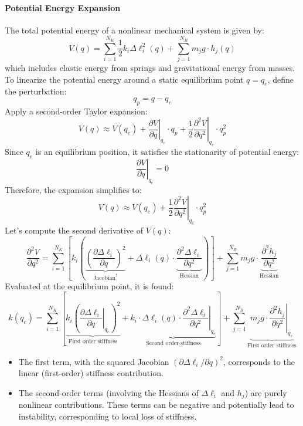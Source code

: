 \paragraph{Potential Energy Expansion}

The total potential energy of a nonlinear mechanical system is given by:
\[
V(q) = \sum_{i=1}^{N_K} \frac{1}{2} k_i \Delta \ell_i^2(q) + \sum_{j=1}^{N_B} m_j g \cdot h_j(q)
\]
which includes elastic energy from springs and gravitational energy from masses. To linearize the potential energy around a static equilibrium point \( q = q_e \), define the perturbation:
\[
q_p = q - q_e
\]
Apply a second-order Taylor expansion:
\[
V(q) \approx V(q_e) + \left. \frac{\partial V}{\partial q} \right|_{q_e} \cdot q_p
+ \frac{1}{2} \left. \frac{\partial^2 V}{\partial q^2} \right|_{q_e} \cdot q_p^2
\]
Since \( q_e \) is an equilibrium position, it satisfies the stationarity of potential energy:
\[
\left. \frac{\partial V}{\partial q} \right|_{q_e} = 0
\]
Therefore, the expansion simplifies to:
\[
V(q) \approx V(q_e) + \frac{1}{2} \left. \frac{\partial^2 V}{\partial q^2} \right|_{q_e} \cdot q_p^2
\]
Let's compute the second derivative of \( V(q) \):
\[
\frac{\partial^2 V}{\partial q^2} =
\sum_{i=1}^{N_K} \left[
k_i \left( \underbrace{\left( \frac{\partial \Delta \ell_i}{\partial q} \right)^2}_{\text{Jacobian}^2}
+ \Delta \ell_i(q) \cdot \underbrace{\frac{\partial^2 \Delta \ell_i}{\partial q^2}}_{\text{Hessian}} \right)
\right]
+ \sum_{j=1}^{N_B} m_j g \cdot \underbrace{\frac{\partial^2 h_j}{\partial q^2}}_{\text{Hessian}}
\]
Evaluated at the equilibrium point, it is found:
\[
k(q_e) =
\sum_{i=1}^{N_K} \left[ \underbrace{k_i
\left( \left. \frac{\partial \Delta \ell_i}{\partial q} \right|_{q_e} \right)^2}_{\text{First order stiffness}}
+ \underbrace{\left. k_i \cdot \Delta \ell_i(q) \cdot \frac{\partial^2 \Delta \ell_i}{\partial q^2} \right|_{q_e}}_{\text{Second order stiffness}}
\right]
+ \sum_{j=1}^{N_B} \underbrace{m_j g \cdot \left. \frac{\partial^2 h_j}{\partial q^2} \right|_{q_e}}_{\text{First order stiffness}}
\]
\begin{itemize}
    \item The first term, with the squared Jacobian \( \left( \partial \Delta \ell_i / \partial q \right)^2 \), corresponds to the linear (first-order) stiffness contribution.
    \item The second-order terms (involving the Hessians of \( \Delta \ell_i \) and \( h_j \)) are purely nonlinear contributions. These terms can be negative and potentially lead to instability, corresponding to local loss of stiffness.
\end{itemize}

